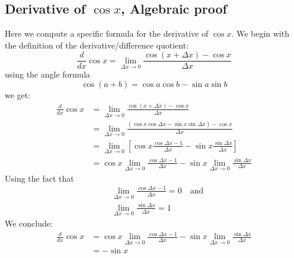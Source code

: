 \documentclass{report}
\begin{document}
\subsection{Derivative of $\cos x$, Algebraic proof} %
Here we compute a specific formula for the derivative of $\cos x$. We begin with the
definition of the derivative/difference quotient:
\begin{equation*}
\frac{d}{dx}\cos x=\lim_{\Delta x\to 0}\frac{\cos(x+\Delta x)-\cos x}{\Delta x}
\end{equation*}
using the angle formula
\begin{equation*}
\cos(a+b)=\cos a\cos b-\sin a\sin b
\end{equation*}
we get:
\begin{align*}
\frac{d}{dx}\cos x&=\lim_{\Delta x\to 0}\frac{\cos(x+\Delta x)-\cos x}{\Delta x}\\
&=\lim_{\Delta x\to 0}\frac{(\cos x\cos\Delta x-\sin x\sin\Delta x)-\cos x}{\Delta x}\\
&=\lim_{\Delta x\to 0}\left[\cos x\frac{\cos\Delta x-1}{\Delta x}
-\sin x\frac{\sin\Delta x}{\Delta x}\right]\\
&=\cos x\lim_{\Delta x\to 0}\frac{\cos\Delta x-1}{\Delta x}
-\sin x\lim_{\Delta x\to 0}\frac{\sin\Delta x}{\Delta x}
\end{align*}
Using the fact that
\begin{align*}
&\lim_{\Delta x\to 0}\frac{\cos\Delta x-1}{\Delta x}=0\quad\text{and}\\
&\lim_{\Delta x\to 0}\frac{\sin\Delta x}{\Delta x}=1
\end{align*}
We conclude:
\begin{align*}
\frac{d}{dx}\cos x&=\cos x\lim_{\Delta x\to 0}\frac{\cos\Delta x-1}{\Delta x}
-\sin x\lim_{\Delta x\to 0}\frac{\sin\Delta x}{\Delta x}\\
&=-\sin x
\end{align*}
\newpage
\end{document}
